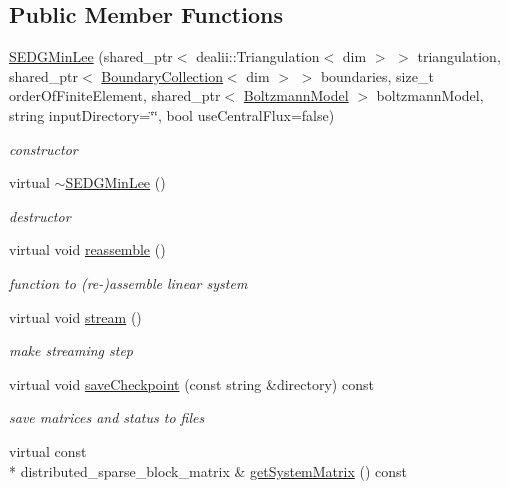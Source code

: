 \subsection*{Public Member Functions}
\begin{DoxyCompactItemize}
\item 
\hyperlink{classnatrium_1_1SEDGMinLee_a5bcf88b62420136630f78323b9b161b8}{S\-E\-D\-G\-Min\-Lee} (shared\-\_\-ptr$<$ dealii\-::\-Triangulation$<$ dim $>$ $>$ triangulation, shared\-\_\-ptr$<$ \hyperlink{classnatrium_1_1BoundaryCollection}{Boundary\-Collection}$<$ dim $>$ $>$ boundaries, size\-\_\-t order\-Of\-Finite\-Element, shared\-\_\-ptr$<$ \hyperlink{classnatrium_1_1BoltzmannModel}{Boltzmann\-Model} $>$ boltzmann\-Model, string input\-Directory=\char`\"{}\char`\"{}, bool use\-Central\-Flux=false)
\begin{DoxyCompactList}\small\item\em constructor \end{DoxyCompactList}\item 
\hypertarget{classnatrium_1_1SEDGMinLee_a6c55a31bc4cb0e314876af7251ad8ce3}{virtual \hyperlink{classnatrium_1_1SEDGMinLee_a6c55a31bc4cb0e314876af7251ad8ce3}{$\sim$\-S\-E\-D\-G\-Min\-Lee} ()}\label{classnatrium_1_1SEDGMinLee_a6c55a31bc4cb0e314876af7251ad8ce3}

\begin{DoxyCompactList}\small\item\em destructor \end{DoxyCompactList}\item 
virtual void \hyperlink{classnatrium_1_1SEDGMinLee_a5fa8b34df3c3bdd9f492a1e555effbe4}{reassemble} ()
\begin{DoxyCompactList}\small\item\em function to (re-\/)assemble linear system \end{DoxyCompactList}\item 
\hypertarget{classnatrium_1_1SEDGMinLee_a04707d696f7f466f17e3de055187ecd9}{virtual void \hyperlink{classnatrium_1_1SEDGMinLee_a04707d696f7f466f17e3de055187ecd9}{stream} ()}\label{classnatrium_1_1SEDGMinLee_a04707d696f7f466f17e3de055187ecd9}

\begin{DoxyCompactList}\small\item\em make streaming step \end{DoxyCompactList}\item 
virtual void \hyperlink{classnatrium_1_1SEDGMinLee_ab3cf80e18230ee7f08f4ed9883b9dadd}{save\-Checkpoint} (const string \&directory) const 
\begin{DoxyCompactList}\small\item\em save matrices and status to files \end{DoxyCompactList}\item 
\hypertarget{classnatrium_1_1SEDGMinLee_adcf3f6321cbf27f6c540a6c5f21c7cb0}{virtual const \\*
distributed\-\_\-sparse\-\_\-block\-\_\-matrix \& \hyperlink{classnatrium_1_1SEDGMinLee_adcf3f6321cbf27f6c540a6c5f21c7cb0}{get\-System\-Matrix} () const }\label{classnatrium_1_1SEDGMinLee_adcf3f6321cbf27f6c540a6c5f21c7cb0}


\end{DoxyCompactItemize}
